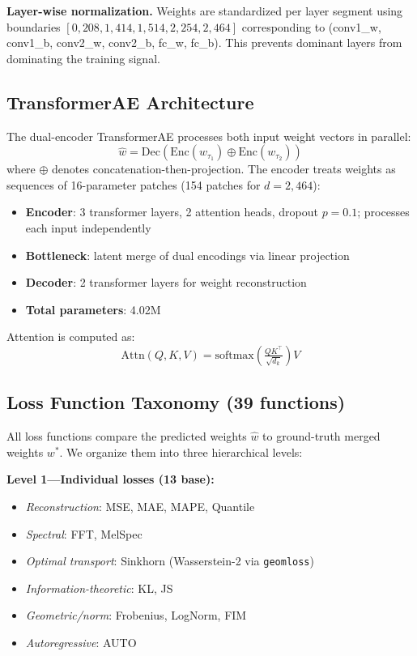 \textbf{Layer-wise normalization.} Weights are standardized per layer segment using boundaries $[0, 208, 1{,}414, 1{,}514, 2{,}254, 2{,}464]$ corresponding to (conv1\_w, conv1\_b, conv2\_w, conv2\_b, fc\_w, fc\_b). This prevents dominant layers from dominating the training signal.

\subsection{TransformerAE Architecture}

The dual-encoder TransformerAE processes both input weight vectors in parallel:
\begin{equation}
\hat{w} = \text{Dec}\!\left(\text{Enc}(w_{\tau_1}) \oplus \text{Enc}(w_{\tau_2})\right)
\label{eq:dual_enc}
\end{equation}
where $\oplus$ denotes concatenation-then-projection. The encoder treats weights as sequences of 16-parameter patches (154 patches for $d=2{,}464$):

\begin{itemize}
    \item \textbf{Encoder}: 3 transformer layers, 2 attention heads, dropout $p=0.1$; processes each input independently
    \item \textbf{Bottleneck}: latent merge of dual encodings via linear projection
    \item \textbf{Decoder}: 2 transformer layers for weight reconstruction
    \item \textbf{Total parameters}: 4.02M
\end{itemize}

Attention is computed as:
\begin{equation}
\text{Attn}(Q,K,V) = \text{softmax}\!\left(\tfrac{QK^\top}{\sqrt{d_k}}\right)V
\label{eq:attention}
\end{equation}

\subsection{Loss Function Taxonomy (39 functions)}

All loss functions compare the predicted weights $\hat{w}$ to ground-truth merged weights $w^*$. We organize them into three hierarchical levels:

\textbf{Level 1---Individual losses (13 base):}
\begin{itemize}
    \item \textit{Reconstruction}: MSE, MAE, MAPE, Quantile
    \item \textit{Spectral}: FFT, MelSpec
    \item \textit{Optimal transport}: Sinkhorn (Wasserstein-2 via \texttt{geomloss})
    \item \textit{Information-theoretic}: KL, JS
    \item \textit{Geometric/norm}: Frobenius, LogNorm, FIM
    \item \textit{Autoregressive}: AUTO
\end{itemize}

